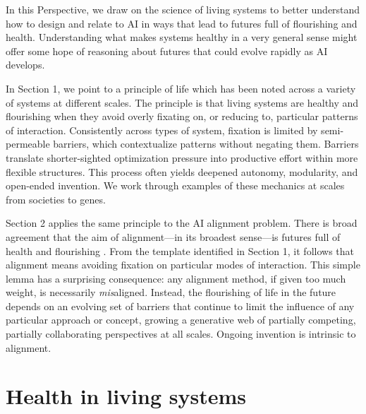 \documentclass[11pt]{article}
\begin{document}
\noindent

In this Perspective, we draw on the science of living systems to better understand how to design and relate to AI in ways that lead to futures full of flourishing and health. Understanding what makes systems healthy in a very general sense might offer some hope of reasoning about futures that could evolve rapidly as AI develops.

In Section 1, we point to a principle of life which has been noted across a variety of systems at different scales. The principle is that living systems are healthy and flourishing when they avoid overly fixating on, or reducing to, particular patterns of interaction. Consistently across types of system, fixation is limited by semi-permeable barriers, which contextualize patterns without negating them. Barriers translate shorter-sighted optimization pressure into productive effort within more flexible structures. This process often yields deepened autonomy, modularity, and open-ended invention. We work through examples of these mechanics at scales from societies to genes.

Section 2 applies the same principle to the AI alignment problem. There is broad agreement that the aim of alignment---in its broadest sense---is futures full of health and flourishing \citep{gabriel2020artificial,bostrom2014superintelligence,russell2019human,christian2020alignment}. From the template identified in Section 1, it follows that alignment means avoiding fixation on particular modes of interaction. This simple lemma has a surprising consequence: any alignment method, if given too much weight, is necessarily \textit{mis}aligned. Instead, the flourishing of life in the future depends on an evolving set of barriers that continue to limit the influence of any particular approach or concept, growing a generative web of partially competing, partially collaborating perspectives at all scales. Ongoing invention is intrinsic to alignment.




\section{Health in living systems}
\end{document}
